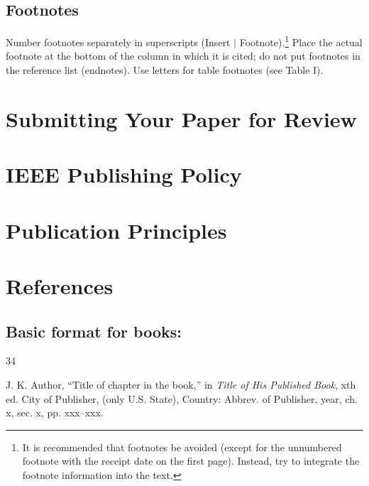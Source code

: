 \documentclass[journal]{IEEEtai}
\begin{document}
\subsection{Footnotes}

Number footnotes separately in superscripts (Insert $|$ Footnote).\footnote{It is recommended that footnotes be avoided (except for the unnumbered footnote with the receipt date on the first page). Instead, try to integrate the footnote information into the text.}  Place the actual footnote at the bottom of the column in which it is cited; do not put footnotes in the reference list (endnotes). Use letters for table footnotes (see Table I). 

\section{Submitting Your Paper for Review}



\section{IEEE Publishing Policy}



\section{Publication Principles}



\section*{References}

\subsection*{Basic format for books:}\vspace*{-12pt}
\def\refname{}
\begin{thebibliography}{34}
\item[] J. K. Author, ``Title of chapter in the book,'' in {\em Title of His Published Book}, xth ed. City of Publisher, (only U.S. State), Country: Abbrev. of Publisher, year, ch. x, sec. x, pp. xxx--xxx.
\end{thebibliography}
\end{document}
